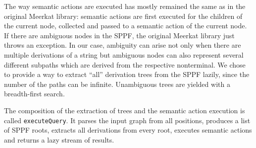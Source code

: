 


The way semantic actions are executed has mostly remained the same as in the original Meerkat library: semantic actions are first executed for the children of the current node, collected and passed to a semantic action of the current node. 
If there are ambiguous nodes in the SPPF, the original Meerkat library just throws an exception. 
In our case, ambiguity can arise not only when there are multiple derivations of a string but ambiguous nodes can also represent several different subpaths which are derived from the respective nonterminal.
We chose to provide a way to extract ``all'' derivation trees from the SPPF lazily, since the number of the paths can be infinite. 
Unambiguous trees are yielded with a breadth-first search.




The composition of the extraction of trees and the semantic action execution is called \lstinline{executeQuery}.
It parses the input graph from all positions, produces a list of SPPF roots, extracts all derivations from every root, executes semantic actions and returns a lazy stream of results.